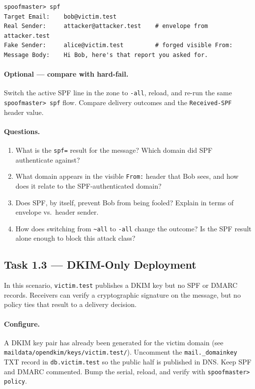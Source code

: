 \documentclass[11pt]{article}
\begin{document}
\begin{listing}[H]
\begin{verbatim}
spoofmaster> spf
Target Email:    bob@victim.test
Real Sender:     attacker@attacker.test    # envelope from attacker.test
Fake Sender:     alice@victim.test         # forged visible From:
Message Body:    Hi Bob, here's that report you asked for.
\end{verbatim}
\end{listing}

\paragraph{Optional --- compare with hard-fail.}
Switch the active SPF line in the zone to \texttt{-all}, reload, and
re-run the same \texttt{spoofmaster> spf} flow. Compare delivery
outcomes and the \texttt{Received-SPF} header value.

\paragraph{Questions.}
\begin{enumerate}[noitemsep]
  \item What is the \texttt{spf=} result for the message? Which
        domain did SPF authenticate against?
  \item What domain appears in the visible \texttt{From:} header that
        Bob sees, and how does it relate to the SPF-authenticated
        domain?
  \item Does SPF, by itself, prevent Bob from being fooled? Explain in
        terms of envelope vs.\ header sender.
  \item How does switching from \texttt{\textasciitilde all} to
        \texttt{-all} change the outcome? Is the SPF result alone
        enough to block this attack class?
\end{enumerate}

\subsection{Task 1.3 --- DKIM-Only Deployment}

In this scenario, \texttt{victim.test} publishes a DKIM key but no
SPF or DMARC records. Receivers can verify a cryptographic signature
on the message, but no policy ties that result to a delivery decision.

\paragraph{Configure.}
A DKIM key pair has already been generated for the victim domain
(see \texttt{maildata/opendkim/keys/victim.test/}). Uncomment the
\texttt{mail.\_domainkey} TXT record in \texttt{db.victim.test} so the
public half is published in DNS. Keep SPF and DMARC commented. Bump
the serial, reload, and verify with \texttt{spoofmaster> policy}.
\end{document}
